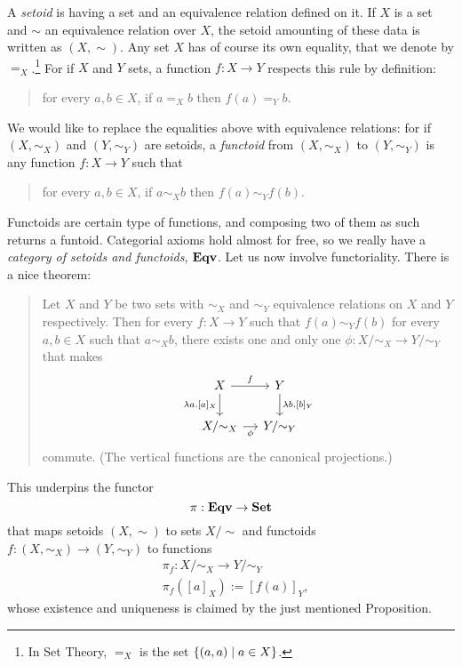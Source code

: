\begin{example}\label{example:CategoryEqv}
A {\em setoid}  is having a set and an equivalence relation defined on it. If \(X\) is a set and \(\sim\) an equivalence relation over \(X\), the setoid amounting of these data is written as \((X, \sim)\). Any set \(X\) has of course its own equality, that we denote by \(=_X\).\footnote{In Set Theory, \(=_X\) is the set \(\left\{(a, a) \mid a \in X\right\}\).}\newline
For if \(X\) and \(Y\) sets, a function \(f : X \to Y\) respects this rule by definition:
\begin{quotation}
for every \(a, b \in X\), if \(a =_X b\) then \(f(a) =_Y b\).
\end{quotation}
We would like to replace the equalities above with equivalence relations: for if \((X, \sim_X)\) and \((Y, \sim_Y)\) are setoids, a {\em functoid}  from \((X, \sim_X)\) to \((Y, \sim_Y)\) is any function \(f : X \to Y\) such that
\begin{quotation}
for every \(a, b \in X\), if \(a \sim_X b\) then \(f(a) \sim_Y f(b)\).
\end{quotation}
Functoids are certain type of functions, and composing two of them as such returns a funtoid. Categorial axioms hold almost for free, so we really have a {\em category of setoids and functoids}, \(\mathbf{Eqv}\).\newline
Let us now involve functoriality. There is a nice theorem:
\begin{quotation}
Let \(X\) and \(Y\) be two sets with \(\sim_X\) and \(\sim_Y\) equivalence relations on \(X\) and \(Y\) respectively. Then for every \(f : X \to Y\) such that \(f(a) \sim_Y f(b)\) for every \(a, b \in X\) such that \(a \sim_X b\), there exists one and only one \(\phi : X{/}{\sim_X} \to Y{/}{\sim_Y}\) that makes
\[\begin{tikzcd}[column sep=small]
X \ar["f", r] \ar["{\lambda a.[a]_X}", d, swap] & Y \ar["{\lambda b.[b]_Y}", d] \\
X{/}{\sim_X} \ar["\phi", r, swap] & Y{/}{\sim_Y}
\end{tikzcd}\]
commute. (The vertical functions are the canonical projections.)
\end{quotation}
This underpins the functor
\[\pi : \mathbf{Eqv} \to \mathbf{Set}\]
that maps setoids \((X, \sim)\) to sets \(X{/}{\sim}\) and functoids \(f : (X, \sim_X) \to (Y, \sim_Y)\) to functions
\[\begin{aligned}
& \pi_f : X{/}{\sim_X} \to Y{/}{\sim_Y} \\
& \pi_f \left([a]_X\right) := \left[f(a)\right]_Y ,
\end{aligned}\]
whose existence and uniqueness is claimed by the just mentioned Proposition.
\end{example}

